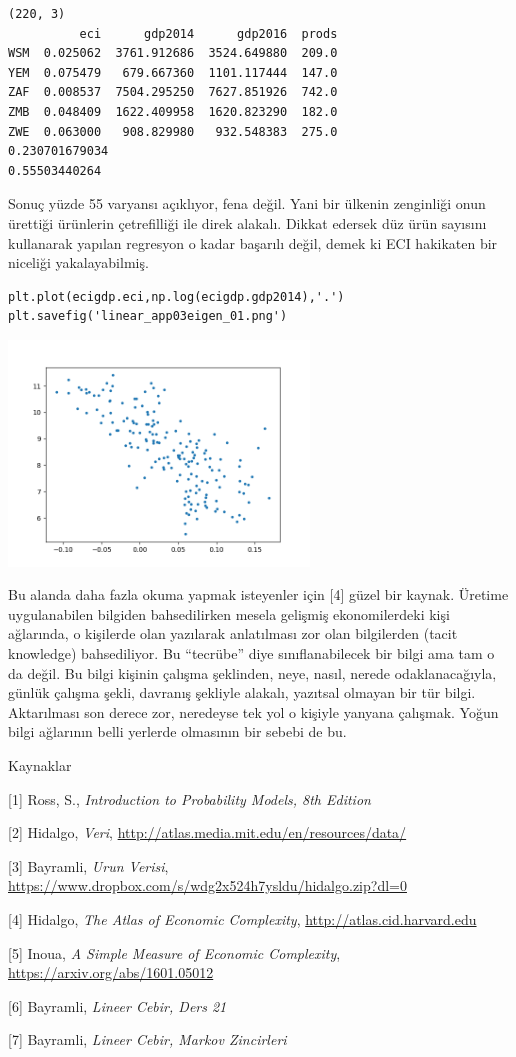 \documentclass[12pt,fleqn]{article}\usepackage{../../common}
\begin{document}
\begin{verbatim}
(220, 3)
          eci      gdp2014      gdp2016  prods
WSM  0.025062  3761.912686  3524.649880  209.0
YEM  0.075479   679.667360  1101.117444  147.0
ZAF  0.008537  7504.295250  7627.851926  742.0
ZMB  0.048409  1622.409958  1620.823290  182.0
ZWE  0.063000   908.829980   932.548383  275.0
0.230701679034
0.55503440264
\end{verbatim}

Sonuç yüzde 55 varyansı açıklıyor, fena değil. Yani bir ülkenin zenginliği
onun ürettiği ürünlerin çetrefilliği ile direk alakalı. Dikkat edersek düz
ürün sayısını kullanarak yapılan regresyon o kadar başarılı değil, demek ki
ECI hakikaten bir niceliği yakalayabilmiş.

\begin{verbatim}
plt.plot(ecigdp.eci,np.log(ecigdp.gdp2014),'.')
plt.savefig('linear_app03eigen_01.png')
\end{verbatim}

\includegraphics[height=6cm]{linear_app03eigen_01.png}

Bu alanda daha fazla okuma yapmak isteyenler için [4] güzel bir
kaynak. Üretime uygulanabilen bilgiden bahsedilirken mesela gelişmiş
ekonomilerdeki kişi ağlarında, o kişilerde olan yazılarak anlatılması zor
olan bilgilerden (tacit knowledge) bahsediliyor. Bu ``tecrübe'' diye
sınıflanabilecek bir bilgi ama tam o da değil. Bu bilgi kişinin çalışma
şeklinden, neye, nasıl, nerede odaklanacağıyla, günlük çalışma şekli,
davranış şekliyle alakalı, yazıtsal olmayan bir tür bilgi. Aktarılması son
derece zor, neredeyse tek yol o kişiyle yanyana çalışmak. Yoğun bilgi
ağlarının belli yerlerde olmasının bir sebebi de bu.

Kaynaklar

[1] Ross, S., {\em Introduction to Probability Models, 8th Edition}

[2] Hidalgo, {\em Veri}, \url{http://atlas.media.mit.edu/en/resources/data/}

[3] Bayramli, {\em Urun Verisi}, \url{https://www.dropbox.com/s/wdg2x524h7ysldu/hidalgo.zip?dl=0}

[4] Hidalgo, {\em The Atlas of Economic Complexity}, \url{http://atlas.cid.harvard.edu}

[5] Inoua, {\em A Simple Measure of Economic Complexity}, \url{https://arxiv.org/abs/1601.05012}

[6] Bayramli, {\em Lineer Cebir, Ders 21}

[7] Bayramli, {\em Lineer Cebir, Markov Zincirleri}
\end{document}

